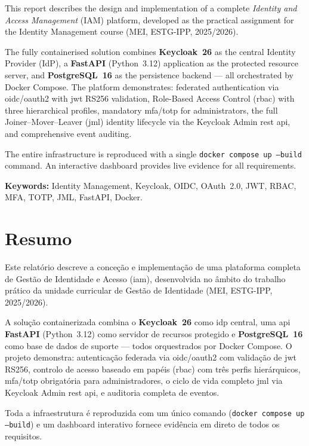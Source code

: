 \documentclass[12pt,a4paper,twoside]{report}
\begin{document}
This report describes the design and implementation of a complete \textit{Identity and Access Management} (IAM) platform, developed as the practical assignment for the Identity Management course (MEI, ESTG-IPP, 2025/2026).

The fully containerised solution combines \textbf{Keycloak~26} as the central Identity Provider (IdP), a \textbf{FastAPI} (Python~3.12) application as the protected resource server, and \textbf{PostgreSQL~16} as the persistence backend — all orchestrated by Docker Compose. The platform demonstrates: federated authentication via \gls{oidc}/\gls{oauth2} with \gls{jwt} RS256 validation, Role-Based Access Control (\gls{rbac}) with three hierarchical profiles, mandatory \gls{mfa}/\gls{totp} for administrators, the full Joiner–Mover–Leaver (\gls{jml}) identity lifecycle via the Keycloak Admin \gls{rest} \gls{api}, and comprehensive event auditing.

The entire infrastructure is reproduced with a single \texttt{docker compose up --build} command. An interactive dashboard provides live evidence for all requirements.

\textbf{Keywords:} Identity Management, Keycloak, OIDC, OAuth~2.0, JWT, RBAC, MFA, TOTP, JML, FastAPI, Docker.

\chapter*{Resumo}

Este relatório descreve a conceção e implementação de uma plataforma completa de Gestão de Identidade e Acesso (\gls{iam}), desenvolvida no âmbito do trabalho prático da unidade curricular de Gestão de Identidade (MEI, ESTG-IPP, 2025/2026).

A solução containerizada combina o \textbf{Keycloak~26} como \gls{idp} central, uma \gls{api} \textbf{FastAPI} (Python~3.12) como servidor de recursos protegido e \textbf{PostgreSQL~16} como base de dados de suporte — todos orquestrados por Docker Compose. O projeto demonstra: autenticação federada via \gls{oidc}/\gls{oauth2} com validação de \gls{jwt} RS256, controlo de acesso baseado em papéis (\gls{rbac}) com três perfis hierárquicos, \gls{mfa}/\gls{totp} obrigatória para administradores, o ciclo de vida completo \gls{jml} via Keycloak Admin \gls{rest} \gls{api}, e auditoria completa de eventos.

Toda a infraestrutura é reproduzida com um único comando (\texttt{docker compose up --build}) e um dashboard interativo fornece evidência em direto de todos os requisitos.
\end{document}

